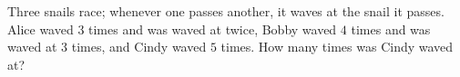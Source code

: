 Three snails race; whenever one passes another, it waves at the snail it passes. Alice waved $3$ times and was waved at twice, Bobby waved $4$ times and was waved at $3$ times, and Cindy waved $5$ times. How many times was Cindy waved at?
